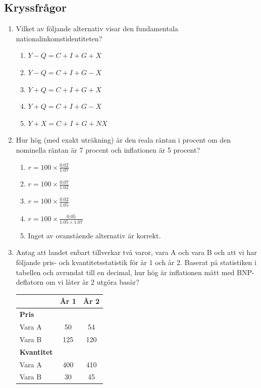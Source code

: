 \documentclass[12pt,a4paper]{article}
\begin{document}
\subsection{Kryssfrågor}
\begin{enumerate}[label=\arabic*.]
    
    \item Vilket av följande alternativ visar den fundamentala nationalinkomstidentiteten?
    \begin{enumerate}[label=\alph*)]
        \item $Y - Q = C + I + G + X$
        \item $Y - Q = C + I + G - X$
        \item $Y + Q = C + I + G + X$
        \item $Y + Q = C + I + G - X$
        \item $Y + X = C + I + G + NX$
    \end{enumerate}

    \item Hur hög (med exakt uträkning) är den reala räntan i procent om den nominella räntan är 7 procent och inflationen är 5 procent?
    \begin{enumerate}[label=\alph*)]
        \item $r = 100 \times \frac{0.02}{1.07}$
        \item $r = 100 \times \frac{0.07}{1.02}$
        \item $r = 100 \times \frac{0.02}{1.05}$
        \item $r = 100 \times \frac{0.05}{1.05 \times 1.07}$
        \item Inget av ovanstående alternativ är korrekt.
    \end{enumerate}

    \item Antag att landet enbart tillverkar två varor, vara A och vara B och att vi har följande pris- och kvantitetsstatistik för år 1 och år 2. Baserat på statistiken i tabellen och avrundat till en decimal, hur hög är inflationen mätt med BNP-deflatorn om vi låter år 2 utgöra basår?
    
    \begin{tabular}{lcc}
        \toprule
         & \textbf{År 1} & \textbf{År 2} \\
        \midrule
        \textbf{Pris} & & \\
        Vara A & 50 & 54 \\
        Vara B & 125 & 120 \\
        \midrule
        \textbf{Kvantitet} & & \\
        Vara A & 400 & 410 \\
        Vara B & 30 & 45 \\
        \bottomrule
    \end{tabular}
    

\end{enumerate}
\end{document}
